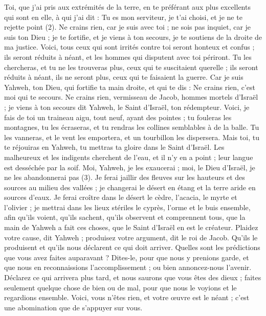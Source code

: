 \begin{multicols}{2}
{Toi, que j’ai pris aux extrémités de la terre, en te préférant aux plus excellents qui sont en elle, à qui j’ai dit : Tu es mon serviteur, je t'ai choisi, et je ne te rejette point (2).
Ne crains rien, car je suis avec toi ; ne sois pas inquiet, car je suis ton Dieu ; je te fortifie, et je viens à ton secours, je te soutiens de la droite de ma justice.
Voici, tous ceux qui sont irrités contre toi seront honteux et confus ; ils seront réduits à néant, et les hommes qui disputent avec toi périront.
Tu les chercheras, et tu ne les trouveras plus, ceux qui te suscitaient querelle ; ils seront réduits à néant, ils ne seront plus, ceux qui te faisaient la guerre.
Car je suis Yahweh, ton Dieu, qui fortifie ta main droite, et qui te dis : Ne crains rien, c'est moi qui te secours.
Ne crains rien, vermisseau de Jacob, hommes mortels d'Israël ; je viens à ton secours dit Yahweh, le Saint d'Israël, ton rédempteur.
Voici, je fais de toi un traineau aigu, tout neuf, ayant des pointes ; tu fouleras les montagnes, tu les écraseras, et tu rendras les collines semblables à de la balle.
Tu les vanneras, et le vent les emportera, et un tourbillon les dispersera. Mais toi, tu te réjouiras en Yahweh, tu mettras ta gloire dans le Saint d'Israël.
Les malheureux et les indigents cherchent de l’eau, et il n’y en a point ; leur langue est desséchée par la soif. Moi, Yahweh, je les exaucerai ; moi, le Dieu d'Israël, je ne les abandonnerai pas (3).
Je ferai jaillir des fleuves sur les hauteurs et des sources au milieu des vallées ; je changerai le désert en étang et la terre aride en sources d'eaux.
Je ferai croître dans le désert le cèdre, l’acacia, le myrte et l'olivier ; je mettrai dans les lieux stériles le cyprès, l'orme et le buis ensemble,
afin qu’ils voient, qu’ils sachent, qu’ils observent et comprennent tous, que la main de Yahweh a fait ces choses, que le Saint d'Israël en est le créateur.
Plaidez votre cause, dit Yahweh ; produisez votre argument, dit le roi de Jacob.
Qu’ils le produisent et qu’ils nous déclarent ce qui doit arriver. Quelles sont les prédictions que vous avez faites auparavant ? Dites-le, pour que nous y prenions garde, et que nous en reconnaissions l’accomplissement ; ou bien annoncez-nous l’avenir.
Déclarez ce qui arrivera plus tard, et nous saurons que vous êtes des dieux ; faites seulement quelque chose de bien ou de mal, pour que nous le voyions et le regardions ensemble.
Voici, vous n’êtes rien, et votre œuvre est le néant ; c’est une abomination que de s’appuyer sur vous.
}
\end{multicols}
